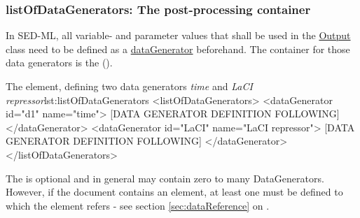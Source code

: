  \subsubsection{listOfDataGenerators: The post-processing container}
\label{sec:listOfDataGenerators}

In SED-ML, all variable- and parameter values that shall be used in the \hyperref[class:output]{Output} class need to be defined as a \hyperref[class:dataGenerator]{dataGenerator} beforehand. The container for those data generators is the  (). 
%

%
\begin{myXmlLst}{The  element, defining two data generators \emph{time} and \emph{LaCI repressor}}{lst:listOfDataGenerators}
<listOfDataGenerators>
 <dataGenerator id="d1" name="time">
  [DATA GENERATOR DEFINITION FOLLOWING]
 </dataGenerator>
 <dataGenerator id="LaCI" name="LaCI repressor">
  [DATA GENERATOR DEFINITION FOLLOWING]
 </dataGenerator>
</listOfDataGenerators>
\end{myXmlLst}

The  is optional and in general may contain zero to many DataGenerators. However, if the \LoneVtwo document contains  an    element, at least one   must be defined to which the  element refers -  see  section \ref{sec:dataReference} on .
%



